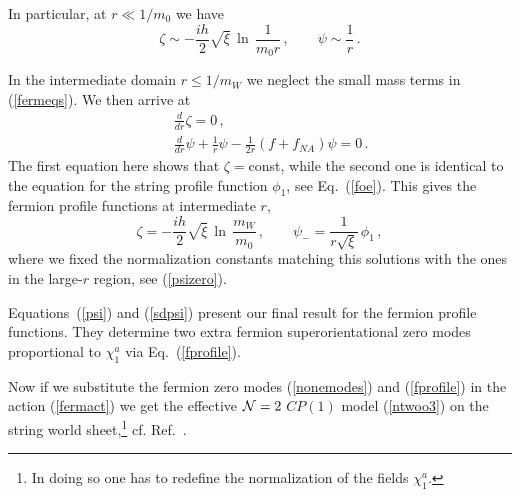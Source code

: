 \documentclass[epsfig,12pt]{article}
\def\beqn{\begin{eqnarray}}
\def\eeqn{\end{eqnarray}}
\def\beq{\begin{equation}}
\def\eeq{\end{equation}}
\newcommand{\ntwo}{${\cal N}=2\;$}
\begin{document}
\noindent
In particular, at $r\ll 1/m_0$ we have
\beq
\zeta\sim -\frac{ih}{2}\sqrt{\xi} \, \ln\, {\frac1{m_0 r}}\,,
\qquad
\psi\sim\frac1r  \,.
\label{psizero}
\eeq

In the intermediate   domain $r\le 1/m_{W}$ we neglect the
small mass terms in (\ref{fermeqs}). We then arrive at
\beqn
&&\frac{d}{dr}\zeta =0\,,
\nonumber\\[3mm]
&&\frac{d}{dr}\psi +\frac1r\psi-\frac1{2r}(f+f_{NA})\psi=0\,.
\label{smallreqs}
\eeqn
The first equation here shows that $\zeta=$const, while the second one 
is  identical to the equation for the string profile
function $\phi_1$, see Eq.~(\ref{foe}).  This gives the fermion profile functions at intermediate $r$,
\beq
\zeta= -\frac{ih}{2}\sqrt{\xi} \, \ln\, {\frac{m_W}{m_0 }}\,,
\qquad
\psi_{-}=\frac{1}{r\sqrt{\xi}}\,\phi_1\, ,
\label{sdpsi}
\eeq
where we fixed the normalization constants matching this solutions with the ones
in the large-$r$ region, see (\ref{psizero}).

Equations~(\ref{psi}) and (\ref{sdpsi}) present our final result for
the fermion profile
functions. They determine two extra fermion
superorientational
zero modes proportional to $\chi_1^a$ via Eq.~(\ref{fprofile}).

Now if we substitute the fermion zero modes (\ref{nonemodes}) and (\ref{fprofile})
in the action (\ref{fermact}) we get the effective \ntwo $CP(1)$ model
(\ref{ntwoo3}) on the string world sheet,\footnote{In doing so one
has to redefine the normalization of the fields $\chi^a_1$.} cf. Ref.~\cite{SYnone}.


\vspace{1cm}
\end{document}
